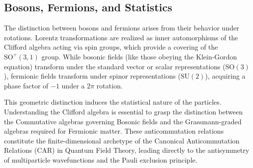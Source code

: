 \subsection{Bosons, Fermions, and Statistics}
The distinction between bosons and fermions arises from their behavior under
rotations. Lorentz transformations are realized as inner automorphisms of the
Clifford algebra acting via spin groups, which provide a covering of the
$\mathrm{SO}^{+}(3,1)$ group. While bosonic fields (like those obeying the Klein-Gordon
equation) transform under the standard vector or scalar representations
($\mathrm{SO}(3)$), fermionic fields transform under spinor representations ($\mathrm{SU}(2)$),
acquiring a phase factor of $-1$ under a $2\pi$ rotation.



This geometric distinction induces the statistical nature of the particles.
Understanding the Clifford algebra is essential to grasp the distinction between
the Commutative algebras governing Bosonic fields and the Grassmann-graded
algebras required for Fermionic matter. These anticommutation relations
constitute the finite-dimensional archetype of the Canonical Anticommutation
Relations (CAR) in Quantum Field Theory, leading directly to the antisymmetry of
multiparticle wavefunctions and the Pauli exclusion principle.
